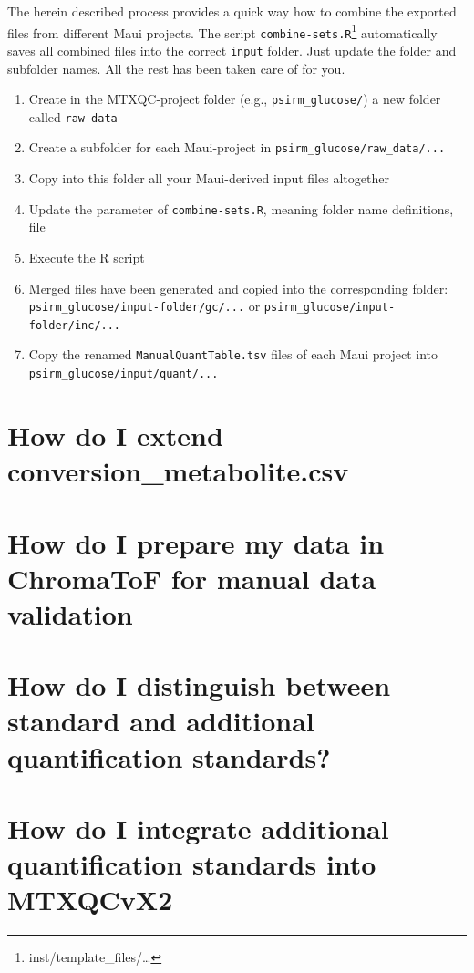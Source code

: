 \documentclass[]{book}
\providecommand{\tightlist}{%
  \setlength{\itemsep}{0pt}\setlength{\parskip}{0pt}}
\let\rmarkdownfootnote\footnote%
\def\footnote{\protect\rmarkdownfootnote}
\theoremstyle{definition}
\theoremstyle{definition}
\theoremstyle{definition}
\theoremstyle{remark}
\begin{document}
The herein described process provides a quick way how to combine the
exported files from different Maui projects. The script
\texttt{combine-sets.R}\footnote{inst/template\_files/\ldots{}}
automatically saves all combined files into the correct \texttt{input}
folder. Just update the folder and subfolder names. All the rest has
been taken care of for you.

\begin{enumerate}
\def\labelenumi{\arabic{enumi}.}
\tightlist
\item
  Create in the MTXQC-project folder (e.g., \texttt{psirm\_glucose/}) a
  new folder called \texttt{raw-data}
\item
  Create a subfolder for each Maui-project in
  \texttt{psirm\_glucose/raw\_data/...}
\item
  Copy into this folder all your Maui-derived input files altogether
\item
  Update the parameter of \texttt{combine-sets.R}, meaning folder name
  definitions, file
\item
  Execute the R script
\item
  Merged files have been generated and copied into the corresponding
  folder: \texttt{psirm\_glucose/input-folder/gc/...} or
  \texttt{psirm\_glucose/input-folder/inc/...}
\item
  Copy the renamed \texttt{ManualQuantTable.tsv} files of each Maui
  project into \texttt{psirm\_glucose/input/quant/...}
\end{enumerate}

\section{How do I extend conversion\_metabolite.csv}\label{extendconse}

\section{How do I prepare my data in ChromaToF for manual data
validation}\label{howmanval}

\section{How do I distinguish between standard and additional
quantification standards?}\label{quantquant}

\section{How do I integrate additional quantification standards into
MTXQCvX2}\label{addqadds}
\end{document}
